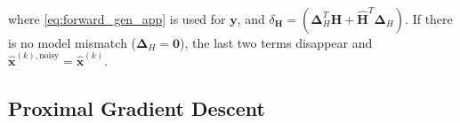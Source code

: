 \begin{align}
\end{align}
where \cref{eq:forward_gen_app} is used for $\bm{y}$, and $\delta_{\bm{H}} = \left( \bm{\Delta}_H^T\bm{H} + \bm{\hat{H}}^T \bm{\Delta}_H \right)$.
If there is no model mismatch (\ie $\bm{\Delta}_H = \bm{0}$), the last two terms disappear and $ \bm{\hat{x}}^{(k),\text{noisy}} = \bm{\hat{x}}^{(k)}$.

\subsection{Proximal Gradient Descent}

